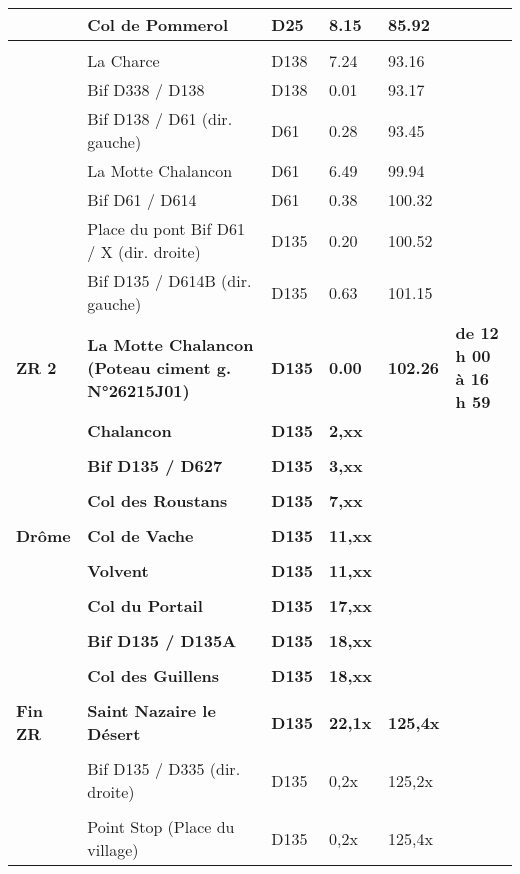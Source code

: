 \documentclass{article}%
\begin{document}
\begin{longtable}{p{2.25cm}|p{6.7cm}|p{2.0cm}|p{1.5cm}|p{1.5cm}|p{3.5cm}}
 &Col de Pommerol&D25&8.15&85.92& \\%
\hline& & & & & \\%
 &La Charce&D138&7.24&93.16& \\%
 &Bif D338 / D138&D138&0.01&93.17& \\%
 &Bif D138 / D61 (dir. gauche)&D61&0.28&93.45& \\%
 &La Motte Chalancon&D61&6.49&99.94& \\%
 &Bif D61 / D614&D61&0.38&100.32& \\%
 &Place du pont Bif D61 / X (dir. droite) &D135&0.20&100.52& \\%
 &Bif D135 / D614B (dir. gauche)&D135&0.63&101.15& \\%
\textbf{ ZR 2      }&\textbf{La Motte Chalancon (Poteau ciment g. N°26215J01)}&\textbf{D135}&\textbf{0.00}&\textbf{102.26}&\textbf{de 12 h 00 à 16 h 59}\\%
 &\textbf{Chalancon}&\textbf{D135}&\textbf{2,xx}& & \\%
 & & & & & \\%
 &\textbf{Bif D135 / D627}&\textbf{D135}&\textbf{3,xx}& & \\%
 & & & & & \\%
 &\textbf{Col des Roustans}&\textbf{D135}&\textbf{7,xx}& & \\%
 & & & & & \\%
\textbf{Drôme}&\textbf{Col de Vache}&\textbf{D135}&\textbf{11,xx}& & \\%
 & & & & & \\%
 &\textbf{Volvent}&\textbf{D135}&\textbf{11,xx}& & \\%
 & & & & & \\%
 &\textbf{Col du Portail}&\textbf{D135}&\textbf{17,xx}& & \\%
 & & & & & \\%
 &\textbf{Bif D135 / D135A}&\textbf{D135}&\textbf{18,xx}& & \\%
 & & & & & \\%
 &\textbf{Col des Guillens}&\textbf{D135}&\textbf{18,xx}& & \\%
 & & & & & \\%
\textbf{Fin ZR}&\textbf{Saint Nazaire le Désert}&\textbf{D135}&\textbf{22,1x}&\textbf{125,4x}& \\%
 & & & & & \\%
 &Bif D135 / D335 (dir. droite)&D135&0,2x&125,2x& \\%
 & & & & & \\%
 &Point Stop (Place du village)&D135&0,2x&125,4x& \\%

\end{longtable}
\end{document}
